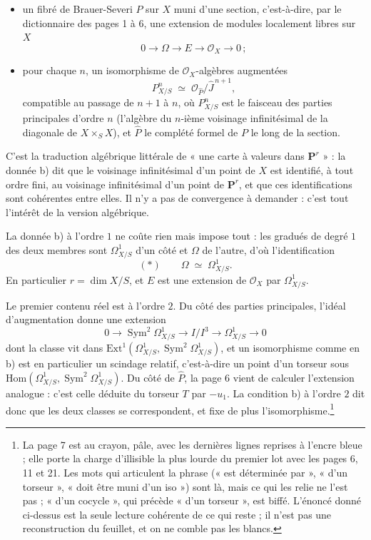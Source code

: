 \documentclass[11pt,a4paper]{article}
\begin{document}
\begin{itemize}
\item[a)] un fibré de Brauer-Severi $P$ sur $X$ muni d'une section,
c'est-à-dire, par le dictionnaire des pages 1 à 6, une extension de modules
localement libres sur $X$
\[
  0 \longrightarrow \Omega \longrightarrow E \longrightarrow
  \mathcal{O}_X \longrightarrow 0 \,;
\]
\item[b)] pour chaque $n$, un isomorphisme de $\mathcal{O}_X$-algèbres
augmentées
\[
  P^n_{X/S} \;\simeq\; \mathcal{O}_{\widehat{P}} \big/ \widehat{J}^{\,n+1},
\]
compatible au passage de $n+1$ à $n$, où $P^n_{X/S}$ est le faisceau des
parties principales d'ordre $n$ (l'algèbre du $n$-ième voisinage
infinitésimal de la diagonale de $X \times_S X$), et $\widehat{P}$ le complété
formel de $P$ le long de la section.
\end{itemize}

C'est la traduction algébrique littérale de « une carte à valeurs dans
$\mathbf{P}^r$ » : la donnée b) dit que le voisinage infinitésimal d'un point
de $X$ est identifié, à tout ordre fini, au voisinage infinitésimal d'un point
de $\mathbf{P}^r$, et que ces identifications sont cohérentes entre elles. Il
n'y a pas de convergence à demander : c'est tout l'intérêt de la version
algébrique.

La donnée b) à l'ordre $1$ ne coûte rien mais impose tout : les gradués de
degré $1$ des deux membres sont $\Omega^1_{X/S}$ d'un côté et $\Omega$ de
l'autre, d'où l'identification
\[
  (*) \qquad \Omega \;\simeq\; \Omega^1_{X/S} .
\]
En particulier $r = \dim X/S$, et $E$ est une extension de $\mathcal{O}_X$ par
$\Omega^1_{X/S}$.

Le premier contenu réel est à l'ordre $2$. Du côté des parties principales,
l'idéal d'augmentation donne une extension
\[
  0 \longrightarrow \operatorname{Sym}^2 \Omega^1_{X/S} \longrightarrow
  I/I^3 \longrightarrow \Omega^1_{X/S} \longrightarrow 0
\]
dont la classe vit dans
$\mathrm{Ext}^1(\Omega^1_{X/S}, \operatorname{Sym}^2\Omega^1_{X/S})$, et un
isomorphisme comme en b) est en particulier un scindage relatif, c'est-à-dire
un point d'un torseur sous
$\mathrm{Hom}(\Omega^1_{X/S}, \operatorname{Sym}^2 \Omega^1_{X/S})$. Du côté
de $\widehat{P}$, la page 6 vient de calculer l'extension analogue : c'est
celle déduite du torseur $T$ par $-u_1$. La condition b) à l'ordre $2$ dit
donc que les deux classes se correspondent, et fixe de plus
l'isomorphisme.\footnote{La page 7 est au crayon, pâle, avec les dernières
lignes reprises à l'encre bleue ; elle porte la charge d'illisible la plus
lourde du premier lot avec les pages 6, 11 et 21. Les mots qui articulent la
phrase (« est déterminée par », « d'un torseur », « doit être muni d'un
iso ») sont là, mais ce qui les relie ne l'est pas ; « d'un cocycle », qui
précède « d'un torseur », est biffé. L'énoncé donné ci-dessus
est la seule lecture cohérente de ce qui reste ; il n'est pas une
reconstruction du feuillet, et on ne comble pas les blancs.}
\end{document}
